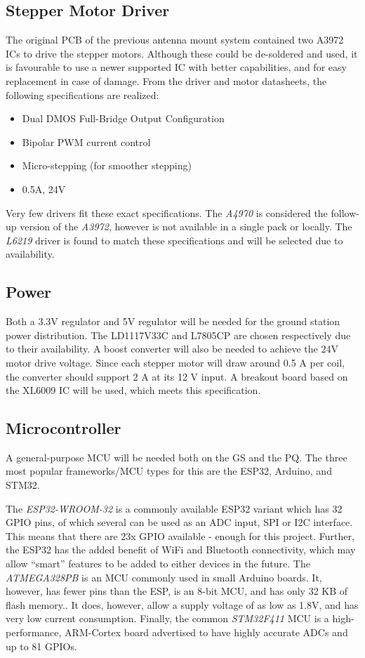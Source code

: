 \subsection{Stepper Motor Driver}
The original PCB of the previous antenna mount system contained two A3972 ICs to drive the stepper motors. Although these could be de-soldered and used, it is favourable to use a newer supported IC with better capabilities, and for easy replacement in case of damage. From the driver and motor datasheets, the following specifications are realized:
\begin{itemize}
    \item Dual DMOS Full-Bridge Output Configuration
    \item Bipolar PWM current control
    \item Micro-stepping (for smoother stepping)
    \item 0.5A, 24V
\end{itemize}

Very few drivers fit these exact specifications. The \textit{A4970} is considered the follow-up version of the \textit{A3972}, however is not available in a single pack or locally. The \textit{L6219} driver is found to match these specifications and will be selected due to availability.

\subsection{Power}
Both a 3.3V regulator and 5V regulator will be needed for the ground station power distribution. The LD1117V33C and L7805CP are chosen respectively due to their availability. A boost converter will also be needed to achieve the 24V motor drive voltage. Since each stepper motor will draw around 0.5 A per coil, the converter should support 2 A at its 12 V input. A breakout board based on the XL6009 IC will be used, which meets this specification.

\subsection{Microcontroller}
A general-purpose MCU will be needed both on the GS and the PQ. The three most popular frameworks/MCU types for this are the ESP32, Arduino, and STM32.

The \textit{ESP32-WROOM-32} is a commonly available ESP32 variant which has 32 GPIO pins, of which several can be used as an ADC input, SPI or I2C interface. This means that there are 23x GPIO available - enough for this project. Further, the ESP32 has the added benefit of WiFi and Bluetooth connectivity, which may allow “smart” features to be added to either devices in the future. The \textit{ATMEGA328PB} is an MCU commonly used in small Arduino boards. It, however, has fewer pins than the ESP, is an 8-bit MCU, and has only 32 KB of flash memory.. It does, however, allow a supply voltage of as low as 1.8V, and has very low current consumption. Finally, the common \textit{STM32F411} MCU is a high-performance, ARM-Cortex board advertised to have highly accurate ADCs and up to 81 GPIOs.

